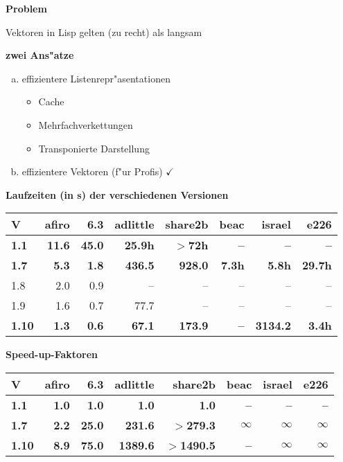 \documentclass[slidesonly]{seminar}
\newcommand{\scaption}[1]{\centerline{\textbf{\large #1}}\medskip}
\newcommand{\header}[1]{\par\medskip\textbf{\large #1}\par}
\begin{document}
%
\begin{slide}
\scaption{Problem}
Vektoren in Lisp gelten (zu recht) als langsam
\header{zwei Ans"atze}
\begin{enumerate}[(a)]
\item
effizientere Listenrepr"asentationen
\begin{itemize}
\item Cache
\item Mehrfachverkettungen
\item Transponierte Darstellung
\end{itemize}
\item
effizientere Vektoren (f"ur Profis) $\checkmark$
\end{enumerate}
\end{slide}
%
\begin{slide}
\scaption{Laufzeiten (in s) der verschiedenen Versionen}
\begin{center}
\begin{small}
\begin{tabular}{lrrrrrrr}
\hline
V  & afiro & 6.3 & adlittle & share2b & beac & israel & e226\\
\hline
\textbf{1.1} & \textbf{11.6} \textbf{} & \textbf{45.0}
\textbf{} &  \textbf{25.9h} \textbf{} &\textbf{$>$72h}
& \textbf{--} & \textbf{--} & \textbf{--} \\
\textbf{1.7} & \textbf{5.3} \textbf{} & \textbf{1.8}
\textbf{} & \textbf{436.5} & \textbf{928.0} & \textbf{7.3h} &
\textbf{5.8h} & \textbf{29.7h}  \\
1.8 & 2.0  & 0.9  & -- & -- & -- & -- & --  \\
1.9 & 1.6  & 0.7  & 77.7  & -- & -- & -- & --  \\
\textbf{1.10} & \textbf{1.3} \textbf{} & \textbf{0.6}
\textbf{} & \textbf{67.1} \textbf{} & \textbf{173.9} &
\textbf{--} & \textbf{3134.2} & \textbf{3.4h} \\
\hline
\end{tabular}
\end{small}
\end{center}
\header{Speed-up-Faktoren}
\begin{center}
\begin{small}
\begin{tabular}{lrrrrrrr}
\hline
V  & afiro & 6.3 & adlittle & share2b & beac & israel & e226\\
\hline
\textbf{1.1} & \textbf{1.0} & \textbf{1.0}
&  \textbf{1.0} &\textbf{1.0}
& \textbf{--} & \textbf{--} & \textbf{--} \\
\textbf{1.7} & \textbf{2.2} & \textbf{25.0}
& \textbf{231.6} & \textbf{$>$279.3} & \textbf{$\infty$} &
\textbf{$\infty$} & \textbf{$\infty$}  \\
\textbf{1.10} & \textbf{8.9} & \textbf{75.0}
& \textbf{1389.6} & \textbf{$>$1490.5} &
\textbf{--} & \textbf{$\infty$} & \textbf{$\infty$} \\
\hline
\end{tabular}
\end{small}
\end{center}
\end{slide}
\end{document}
